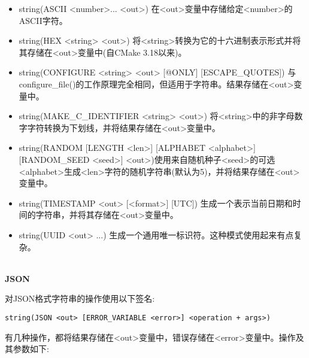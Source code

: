 \begin{itemize}
\item 
string(ASCII <number>... <out>) 在<out>变量中存储给定<number>的ASCII字符。

\item 
string(HEX <string> <out>) 将<string>转换为它的十六进制表示形式并将其存储在<out>变量中(自CMake 3.18以来)。

\item 
string(CONFIGURE <string> <out> [@ONLY] [ESCAPE\_QUOTES]) 与configure\_file()的工作原理完全相同，但适用于字符串。结果存储在<out>变量中。

\item 
string(MAKE\_C\_IDENTIFIER <string> <out>) 将<string>中的非字母数字字符转换为下划线，并将结果存储在<out>变量中。

\item
string(RANDOM [LENGTH <len>] [ALPHABET <alphabet>] [RANDOM\_SEED <seed>] <out>)使用来自随机种子<seed>的可选<alphabet>生成<len>字符的随机字符串(默认为5)，并将结果存储在<out>变量中。

\item
string(TIMESTAMP <out> [<format>] [UTC]) 生成一个表示当前日期和时间的字符串，并将其存储在<out>变量中。

\item
string(UUID <out> ...) 生成一个通用唯一标识符。这种模式使用起来有点复杂。
\end{itemize}

\hspace*{\fill} \\ %
\noindent
\textbf{JSON}

对JSON格式字符串的操作使用以下签名:

\begin{lstlisting}[style=styleCMake]
string(JSON <out> [ERROR_VARIABLE <error>] <operation + args>)
\end{lstlisting}

有几种操作，都将结果存储在<out>变量中，错误存储在<error>变量中。操作及其参数如下:

